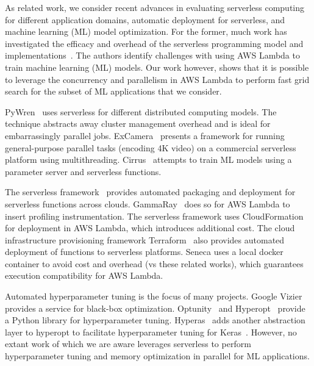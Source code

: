 As related work, we consider recent advances
in evaluating serverless computing for different application domains, 
automatic deployment for serverless, and machine learning (ML) model optimization. 
For the former, much work has investigated the efficacy and overhead of the
serverless programming model and 
implementations~\cite{ref:jonas2017occupy,ref:onesteptwostep,ref:baldini2017,ref:lin2018tracking}.
The authors identify challenges with 
using AWS Lambda to train machine learning (ML) models.
Our work however, shows that it is possible to leverage the concurrency 
and parallelism in AWS Lambda to perform fast grid search for the
subset of ML applications that we consider.

PyWren~\cite{ref:jonas2017occupy} uses serverless for
different distributed computing models. The technique abstracts away cluster management overhead and is ideal for embarrassingly parallel jobs.
ExCamera~\cite{ref:encoding} presents a framework for running general-purpose parallel tasks (encoding 4K video) on a commercial serverless platform using multithreading. Cirrus~\cite{ref:jonas2019cloud} attempts to train ML models using a parameter server and serverless functions. 

The serverless framework~\cite{ref:serverless_framework} provides
automated packaging and deployment for serverless functions across clouds. 
GammaRay~\cite{gammaray18} does so for AWS Lambda to insert profiling instrumentation.
The serverless framework uses 
CloudFormation~\cite{ref:cloudformation} for deployment in AWS Lambda, which introduces additional cost. 
The cloud infrastructure provisioning 
framework Terraform~\cite{ref:terraform}
also provides automated deployment of functions to serverless platforms.
Seneca uses a local docker container to avoid  cost and overhead (vs these related
works), which guarantees execution compatibility for AWS Lambda. 

Automated hyperparameter tuning is the focus of
many projects. Google Vizier~\cite{ref:vizier} provides a service for 
black-box optimization. Optunity~\cite{ref:claesen2014hyperparameter} 
and Hyperopt~\cite{ref:hyperopt}
provide a Python library for hyperparameter tuning. 
Hyperas~\cite{ref:hyperas} adds another 
abstraction layer to hyperopt to facilitate hyperparameter tuning for 
Keras~\cite{ref:keras}. However, no extant work of which 
we are aware leverages
serverless to perform hyperparameter tuning and memory optimization in parallel 
for ML applications.
